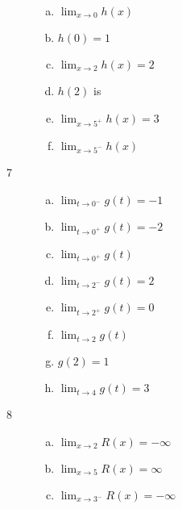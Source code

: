 \documentclass[letterpaper, landscape]{exam}
\begin{document}
\begin{description}
\begin{enumerate}[(a)]
          \item $\lim_{x \to 0} h(x)$ 

          \item $h(0) = \boxed{ 1 }$

          \item $\lim_{x \to 2} h(x) = \boxed{ 2 }$ 

          \item $h(2)$ is 

          \item $\lim_{x \to 5^+} h(x) = \boxed{ 3 }$

          \item $\lim_{x \to 5^-} h(x)$ 

        \end{enumerate}

      \item[7]
        \begin{enumerate}[(a)]
          \item $\lim_{t \to 0^-} g(t) = \boxed{ -1 }$

          \item $\lim_{t \to 0^+} g(t) = \boxed{ -2 }$

          \item $\lim_{t \to 0^+} g(t)$ 

          \item $\lim_{t \to 2^-} g(t) = \boxed{ 2 }$

          \item $\lim_{t \to 2^+} g(t) = \boxed{ 0 }$

          \item $\lim_{t \to 2} g(t)$ 

          \item $g(2) = \boxed{ 1 }$

          \item $\lim_{t \to 4} g(t) = \boxed{ 3 }$
        \end{enumerate}

      \item[8]
        \begin{enumerate}[(a)]
          \item $\lim_{x \to 2} R(x) = \boxed{ -\infty }$

          \item $\lim_{x \to 5} R(x) = \boxed{ \infty }$

          \item $\lim_{x \to 3^-} R(x) = \boxed{ -\infty }$


\end{enumerate}
\end{description}
\end{document}
